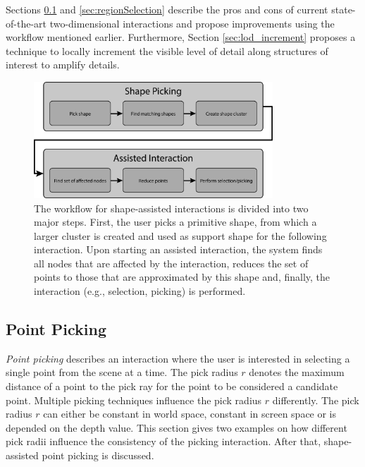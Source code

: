 \par

Sections \ref{sec:pointPicking} and \ref{sec:regionSelection} describe the pros and cons of current state-of-the-art two-dimensional interactions and propose improvements using the workflow mentioned earlier. Furthermore, Section \ref{sec:lod_increment} proposes a technique to locally increment the visible level of detail along structures of interest to amplify details. 


\begin{figure}
    \centering
    \includegraphics[width=0.8\textwidth]{System_Design/interaction_workflow.png}%
    \caption[Workflow of an assisted user interaction]
    {The workflow for shape-assisted interactions is divided into two major steps. First, the user picks a primitive shape, from which a larger cluster is created and used as support shape for the following interaction. Upon starting an assisted interaction, the system finds all nodes that are affected by the interaction, reduces the set of points to those that are approximated by this shape and, finally, the interaction (e.g., selection, picking) is performed. }
        \label{fig:interaction_workflow}
\end{figure}
    

    
\subsection{Point Picking}
\label{sec:pointPicking}

\textit{Point picking} describes an interaction where the user is interested in selecting a single point from the scene at a time. The pick radius $r$ denotes the maximum distance of a point to the pick ray for the point to be considered a candidate point. Multiple picking techniques influence the pick radius $r$ differently. The pick radius $r$ can either be constant in world space, constant in screen space or is depended on the depth value. This section gives two examples on how different pick radii influence the consistency of the picking interaction. After that, shape-assisted point picking is discussed.


